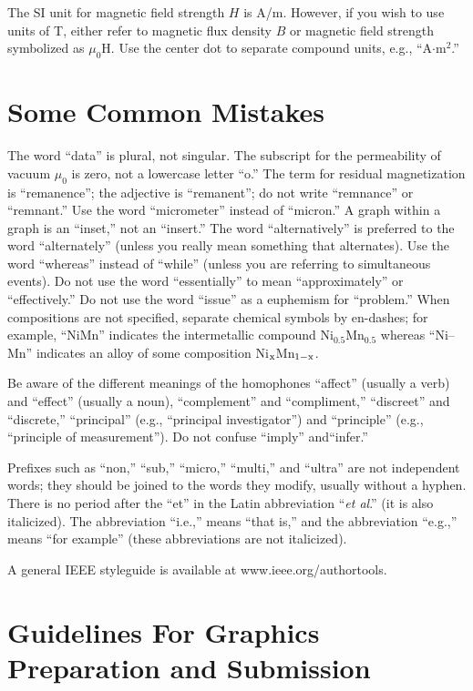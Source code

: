 \documentclass[journal]{IEEEtai}
\begin{document}
The SI unit for magnetic field strength $H$ is A/m. However, if you wish to use units of T, either refer to magnetic flux density $B$ or magnetic field strength symbolized as $\mu_0$H. Use the center dot to separate compound units, e.g., ``A$\cdot$m$^2$.''

\section{Some Common Mistakes}

The word ``data'' is plural, not singular. The subscript for the permeability of vacuum $\mu_0$ is zero, not a lowercase letter ``o.'' The term for residual magnetization is ``remanence''; the adjective is ``remanent''; do not write ``remnance'' or ``remnant.'' Use the word ``micrometer'' instead of ``micron.'' A graph within a graph is an ``inset,'' not an ``insert.'' The word ``alternatively'' is preferred to the word ``alternately'' (unless you really mean something that alternates). Use the word ``whereas'' instead of ``while'' (unless you are referring to simultaneous events). Do not use the word ``essentially'' to mean ``approximately'' or ``effectively.'' Do not use the word ``issue'' as a euphemism for ``problem.'' When compositions are not specified, separate chemical symbols by en-dashes; for example, ``NiMn'' indicates the intermetallic compound Ni$_{0.5}$Mn$_{0.5}$ whereas ``Ni--Mn'' indicates an alloy of some composition Ni$_{\rm x}$Mn$_{1-{\rm x}}$.

Be aware of the different meanings of the homophones ``affect'' (usually a verb) and ``effect'' (usually a noun), ``complement'' and ``compliment,'' ``discreet'' and ``discrete,'' ``principal'' (e.g., ``principal investigator'') and ``principle'' (e.g., ``principle of measurement''). Do not confuse ``imply'' and\break ``infer.'' 

Prefixes such as ``non,'' ``sub,'' ``micro,'' ``multi,'' and ``ultra'' are not independent words; they should be joined to the words they modify, usually without a hyphen. There is no period after the ``et'' in the Latin abbreviation ``{\it et al}.'' (it is also italicized). The abbreviation ``i.e.,'' means ``that is,'' and the abbreviation ``e.g.,'' means ``for example'' (these abbreviations are not italicized).

A general IEEE styleguide is available at www.ieee.org/authortools.

\section{Guidelines For Graphics Preparation and Submission}
\end{document}

